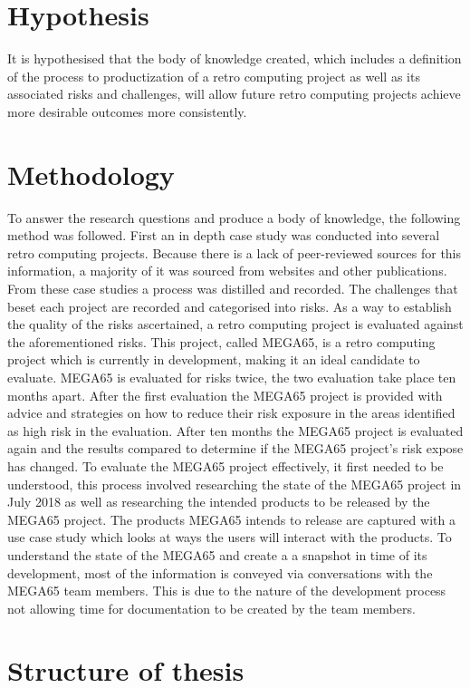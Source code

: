 \section{Hypothesis}
It is hypothesised that the body of knowledge created, which includes a definition of the process to productization of a retro computing project as well as its associated risks and challenges, will allow future retro computing projects achieve more desirable outcomes more consistently.

\section{Methodology}
To answer the research questions and produce a body of knowledge, the following method was followed. First an in depth case study was conducted into several retro computing projects. Because there is a lack of peer-reviewed sources for this information, a majority of it was sourced from websites and other publications. From these case studies a process was distilled and recorded. The challenges that beset each project are recorded and categorised into risks. As a way to establish the quality of the risks ascertained, a retro computing project is evaluated against the aforementioned risks. This project, called MEGA65, is a retro computing project which is currently in development, making it an ideal candidate to evaluate. MEGA65 is evaluated for risks twice, the two evaluation take place ten months apart. After the first evaluation the MEGA65 project is provided with advice and strategies on how to reduce their risk exposure in the areas identified as high risk in the evaluation. After ten months the MEGA65 project is evaluated again and the results compared to determine if the MEGA65 project's risk expose has changed. To evaluate the MEGA65 project effectively, it first needed to be understood, this process involved researching the state of the MEGA65 project in July 2018 as well as researching the intended products to be released by the MEGA65 project. The products MEGA65 intends to release are captured with a use case study which looks at ways the users will interact with the products. To understand the state of the MEGA65 and create a a snapshot in time of its development, most of the information is conveyed via conversations with the MEGA65 team members. This is due to the nature of the development process not allowing time for documentation to be created by the team members. 

\section{Structure of thesis}
